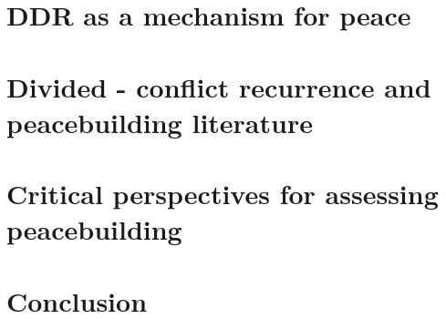 \section{DDR as a mechanism for peace}





\section{Divided - conflict recurrence and peacebuilding literature}





\section{Critical perspectives for assessing peacebuilding}





\section{Conclusion}
